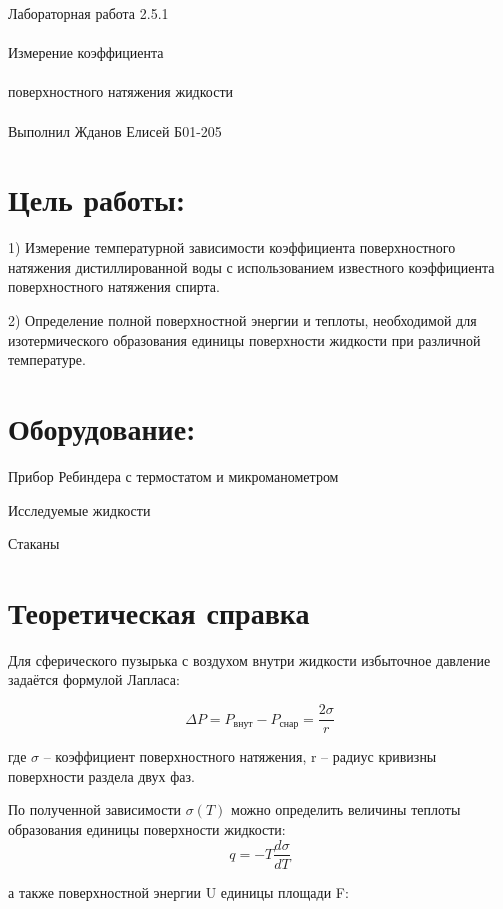 \documentclass{astroedu-lab}
\begin{document}
\pagestyle{plain}

\begin{problem}{\huge Лабораторная работа 2.5.1\\\\Измерение коэффициента\\\\поверхностного натяжения жидкости\\\\Выполнил Жданов Елисей Б01-205}

\section{Цель работы:}

1) Измерение температурной зависимости  коэффициента поверхностного натяжения дистиллированной воды с использованием известного коэффициента поверхностного натяжения спирта.

2) Определение полной поверхностной энергии  и теплоты, необходимой для изотермического образования единицы  поверхности жидкости при различной температуре. 

\section{Оборудование:}

Прибор  Ребиндера  с термостатом и микроманометром

Исследуемые жидкости

Стаканы

\section{Теоретическая справка}

Для сферического пузырька с воздухом  внутри жидкости избыточное давление задаётся формулой Лапласа:

\begin{equation}
	\Delta P = P_{\text {внут}}-P_{\text {снар}}=\frac{2 \sigma}{r}	
\end{equation}

где $\sigma$ – коэффициент поверхностного натяжения, r – радиус кривизны поверхности раздела двух фаз.

По полученной зависимости $\sigma(T)$ можно определить величины теплоты образования единицы поверхности жидкости:
\[
q = -T \frac{d\sigma}{d T}
\]

а также поверхностной энергии U единицы площади F:


\end{problem}
\end{document}
